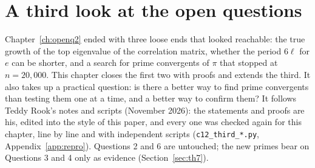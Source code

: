 \chapter{A third look at the open questions}\label{ch:third}
\addednote{\revC}

Chapter~\ref{ch:openq2} ended with three loose ends that looked reachable: the true growth of the top eigenvalue of the correlation matrix, whether the period $6\ell$ for $e$ can be shorter, and a search for prime convergents of $\pi$ that stopped at $n = 20{,}000$. This chapter closes the first two with proofs and extends the third. It also takes up a practical question: is there a better way to find prime convergents than testing them one at a time, and a better way to confirm them? It follows Teddy Rook's notes and scripts (November 2026): the statements and proofs are his, edited into the style of this paper, and every one was checked again for this chapter, line by line and with independent scripts (\texttt{c12\_third\_*.py}, Appendix~\ref{app:repro}). Questions 2 and 6 are untouched; the new primes bear on Questions 3 and 4 only as evidence (Section~\ref{sec:th7}).
